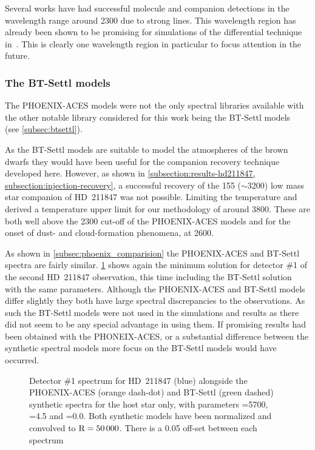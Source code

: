 Several works \citet[e.g.][]{brogi_carbon_2014, brogi_rotation_2016, piskorz_evidence_2016} have had successful molecule and companion detections in the wavelength range around 2300\nm{} due to strong  lines.
This wavelength region has already been shown to be promising for simulations of the differential technique in~\citet{kostogryz_spectral_2013}.
This is clearly one wavelength region in particular to focus attention in the future.


\subsubsection{The {BT-Settl} models}
\label{subsubsec:bt-settl}
The {PHOENIX-ACES} models were not the only spectral libraries available with the other notable library considered for this work being the {BT-Settl} models~\citep{allard_model_2010,allard_btsettl_2013,baraffe_new_2015} (see \cref{subsec:btsettl}).

As the {BT-Settl} models are suitable to model the atmospheres of the brown dwarfs they would have been useful for the companion recovery technique developed here.
However, as shown in \cref{subsection:results-hd211847, subsection:injection-recovery}, a successful recovery of the 155\Mjup{} (\Teff{}\(\sim\)3200\K{}) low mass star companion of {HD~211847} was not possible.
Limiting the temperature and derived a temperature upper limit for \textrm{our} methodology of around 3800\K{}.
These are both well above the 2300\K{} cut-off of the {PHOENIX-ACES} models and for the onset of dust- and cloud-formation phenomena, at 2600\K{}.

As shown in \cref{subsec:phoenix_comparision} the {PHOENIX-ACES} and {BT-Settl} spectra are fairly similar.
\cref{fig:hd211847-models} shows again the minimum \textchisquared{} solution for detector \#1 of the second {HD~211847} observation, this time including the {BT-Settl} solution with the same parameters.
Although the {PHOENIX-ACES} and {BT-Settl} models differ slightly they both have large spectral discrepancies to the observations.
As such the {BT-Settl} models were not used in the \textchisquared{} simulations and results as there did not seem to be any special advantage in using them.
If promising results had been obtained with the {PHONEIX-ACES}, or a substantial difference between the synthetic spectral models more focus on the {BT-Settl} models would have occurred.


\begin{figure}
    \centering
    \caption{Detector \#1 spectrum for {HD~211847} (blue) alongside the {PHOENIX-ACES} (orange dash-dot) and {BT-Settl} (green dashed) synthetic spectra for the host star only, with parameters \Teff{}=5700\K{}, \Logg{}=4.5 and \feh{}=0.0.
        Both synthetic models have been normalized and convolved to \(\rm R=50\,000\).
        There is a 0.05 off-set between each spectrum}
    \label{fig:hd211847-models}
\end{figure}


